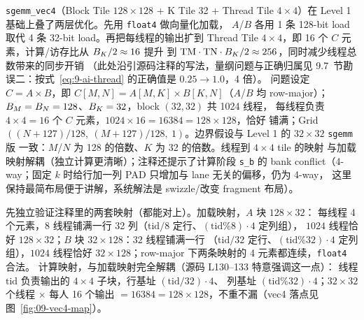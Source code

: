 \texttt{sgemm\_vec4}（Block Tile $128\times128$ + K Tile 32 + Thread Tile
$4\times4$）在 Level 1 基础上叠了两层优化。先用 \texttt{float4} 做向量化加载，
$A$/$B$ 各用 1 条 128-bit load 取代 4 条 32-bit load。再把每线程的输出扩到
Thread Tile $4\times4$，即 16 个 $C$ 元素，计算/访存比从 $B\sb{K}/2\approx16$ 提升
到 $\mathrm{TM}\cdot\mathrm{TN}\cdot B\sb{K}/2\approx256$，同时减少线程总数带来的同步开销
（此处沿引源码注释的写法，量纲问题与正确归属见 9.7~节勘误二：按式~\ref{eq:9-ai-thread}
的正确值是 $0.25 \to 1.0$，4 倍）。
问题设定 $C = A \times B$，即 $C[M,N] = A[M,K] \times B[K,N]$（$A$/$B$ 均
row-major）；$B\sb{M}=B\sb{N}=128$、$B\sb{K}=32$，block $(32,32)$ 共 1024 线程，
每线程负责 $4\times4=16$ 个 $C$ 元素，$1024\times16=16384=128\times128$，恰好
铺满；Grid $((N+127)/128,\ (M+127)/128,\ 1)$。边界假设与 Level 1 的
$32{\times}32$ \texttt{sgemm} 版
一致：$M$/$N$ 为 128 的倍数、$K$ 为 32 的倍数。线程到 $4\times4$ tile 的映射
与加载映射解耦（独立计算更清晰）；注释还提示了计算阶段 \texttt{s\_b} 的
bank conflict（4-way；固定 $k$ 时给行加一列 PAD 只增加与 lane 无关的偏移，仍为 4-way，
这里保持最简布局便于讲解，系统解法是 swizzle/改变 fragment 布局）。

先独立验证注释里的两套映射（都能对上）。加载映射，$A$ 块 $128 \times 32$：
每线程 4 个元素，$8$ 线程铺满一行 32 列（$\mathrm{tid}/8$ 定行、$(\mathrm{tid}\%8) \cdot 4$ 定列组），
$1024$ 线程恰好 $128 \times 32$；$B$ 块 $32 \times 128$：$32$ 线程铺满一行
（$\mathrm{tid}/32$ 定行、$(\mathrm{tid}\%32) \cdot 4$ 定列组），$1024$ 线程恰好
$32 \times 128$；row-major 下两条映射的 4 元素都连续，\texttt{float4} 合法。
计算映射，与加载映射完全解耦（源码 L130--133 特意强调这一点）：
线程 $\mathrm{tid}$ 负责输出的 $4 \times 4$ 子块，行基址 $(\mathrm{tid}/32) \cdot 4$、
列基址 $(\mathrm{tid}\%32) \cdot 4$；$32 \times 32$ 个线程 $\times$ 每人 16 个输出
$= 16384 = 128 \times 128$，不重不漏（vec4 落点见图~\ref{fig:09-vec4-map}）。


